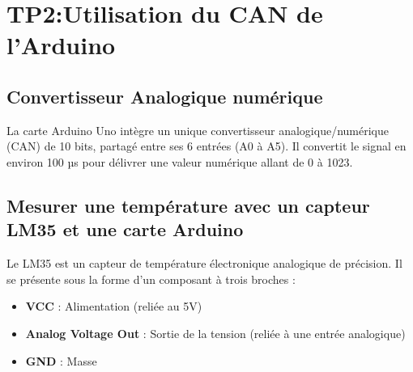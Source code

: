 \chapter{TP2:Utilisation du CAN de l’Arduino}
\minitoc
\newpage
\section{Convertisseur Analogique numérique}
La carte Arduino Uno intègre un unique convertisseur analogique/numérique (CAN) de 10 bits, partagé entre ses 6 entrées (A0 à A5). Il convertit le signal en environ 100 µs pour délivrer une valeur numérique allant de 0 à 1023.
\section{Mesurer une température avec un capteur LM35 et une carte Arduino}
Le LM35 est un capteur de température électronique analogique de précision. Il se présente sous la forme d'un composant à trois broches :
\begin{itemize}
	\item \textbf{VCC} : Alimentation (reliée au 5V)
	\item \textbf{Analog Voltage Out} : Sortie de la tension (reliée à une entrée analogique)
	\item \textbf{GND} : Masse
\end{itemize}
